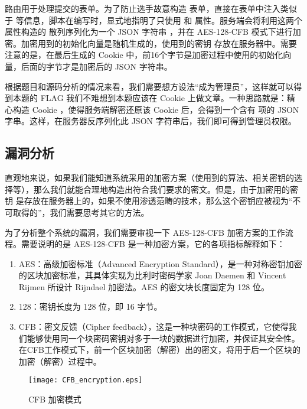 \documentclass[a4paper,UTF8]{ctexart}
\begin{document}
 路由用于处理提交的表单。为了防止选手故意构造  表单，直接在表单中注入类似于  等信息，脚本在编写时，显式地指明了只使用   和  属性。服务端会将利用这两个属性构造的  散列序列化为一个 JSON 字符串 ，并在 AES-128-CFB 模式下进行加密。加密用到的初始化向量是随机生成的，使用到的密钥  存放在服务器中。需要注意的是，在最后生成的 Cookie 中，前16个字节是加密过程中使用的初始化向量，后面的字节才是加密后的 JSON 字符串。

根据题目和源码分析的情况来看，我们需要想方设法“成为管理员”，这样就可以得到本题的 FLAG 我们不难想到本题应该在 Cookie 上做文章。一种思路就是：精心构造 Cookie ，使得服务端解密还原该 Cookie 后，会得到一个含有  项的 JSON 字串。这样，在服务器反序列化此 JSON 字符串后，我们即可得到管理员权限。

\subsection{漏洞分析}

直观地来说，如果我们能知道系统采用的加密方案（使用到的算法、相关密钥的选择等），那么我们就能合理地构造出符合我们要求的密文。但是，由于加密用的密钥  是存放在服务器上的，如果不使用渗透范畴的技术，那么这个密钥应被视为“不可取得的”，我们需要思考其它的方法。

为了分析整个系统的漏洞，我们需要审视一下 AES-128-CFB 加密方案的工作流程\cite{wiki_aes}\cite{wiki_bcmo}。需要说明的是 AES-128-CFB 是一种加密方案，它的各项指标解释如下：

\begin{enumerate}
  \item AES：高级加密标准（Advanced Encryption Standard），是一种对称密钥加密的区块加密标准，其具体实现为比利时密码学家 Joan Daemen 和 Vincent Rijmen 所设计 Rijndael 加密法。AES 的密文块长度固定为 128 位。
  \item 128：密钥长度为 128 位，即 16 字节。
  \item CFB：密文反馈（Cipher feedback），这是一种块密码的工作模式，它使得我们能够使用同一个块密码密钥对多于一块的数据进行加密，并保证其安全性。在CFB工作模式下，前一个区块加密（解密）出的密文，将用于后一个区块的加密（解密）过程中。
\end{enumerate}

\begin{figure}[hbt!]
  \texttt{[image: CFB\_encryption.eps]}
  \caption{CFB 加密模式}\label{cfb-enc}
\end{figure}
\end{document}

